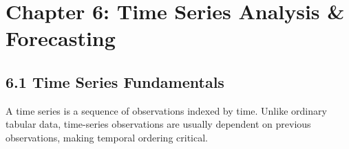 \documentclass[
  10pt,
  letterpaper,
]{article}
\begin{document}
\clearpage
\hypertarget{chapter-6-time-series-analysis-forecasting}{%
\section{Chapter 6: Time Series Analysis \& Forecasting}\label{chapter-6-time-series-analysis-forecasting}}

\hypertarget{time-series-fundamentals}{%
\subsection{6.1 Time Series Fundamentals}\label{time-series-fundamentals}}

A time series is a sequence of observations indexed by time. Unlike ordinary
tabular data, time-series observations are usually dependent on previous
observations, making temporal ordering critical.
\end{document}

